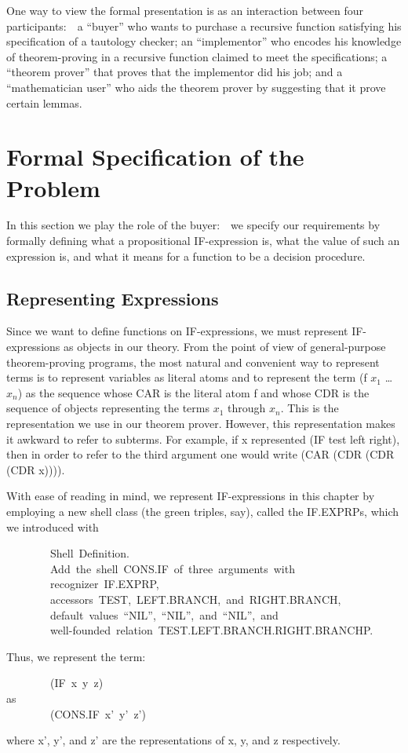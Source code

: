 \documentclass[10pt]{book}
\newenvironment{pubasis}{\begin{flushleft}}{\end{flushleft}}
\begin{document}
One way to view the formal presentation
is as an interaction between four participants:~~a ``buyer'' who
wants to purchase a recursive function satisfying his specification
of a tautology checker; an ``implementor'' who encodes his knowledge
of theorem-proving in a recursive function claimed to meet the
specifications; a ``theorem prover'' that proves that the implementor
did his job; and a ``mathematician user'' who aids the theorem prover
by suggesting that it prove certain lemmas.

\section{Formal Specification of the Problem}
In this section we play the role of the buyer:~~we specify our
requirements by formally defining what a propositional IF-expression is,
what the value of such an expression is, and what it means
for a function to be a decision procedure.
\subsection{Representing Expressions}
Since we want to define functions on IF-expressions, we
must represent IF-expressions as objects in our theory.
From the point of view of general-purpose theorem-proving programs, the most natural and convenient
way to  represent
terms is to represent variables as literal atoms and to represent
the term (f $x_{1}$ \ldots{} $x_{n}$) as the sequence whose CAR is the literal atom f and
whose CDR is the sequence of objects representing the terms $x_{1}$ through
$x_{n}$.  This is the representation we use in our theorem prover.  However,
this representation  makes it awkward to refer to subterms.
For example, if x    represented 
(IF test left right), then in order to refer to the third argument one
would write (CAR (CDR (CDR (CDR x)))).

With ease of reading in mind,
we  represent IF-expressions in this chapter by employing
a new shell class (the green triples, say), called the IF.EXPRPs,
which we introduced with
\begin{pubasis}
~~~~~~~~Shell~Definition.\\
~~~~~~~~Add~the~shell~CONS.IF~of~three~arguments~with\\
~~~~~~~~recognizer~IF.EXPRP,\\
~~~~~~~~accessors~TEST,~LEFT.BRANCH,~and~RIGHT.BRANCH,\\
~~~~~~~~default~values~``NIL'',~``NIL'',~and~``NIL'',~and\\
~~~~~~~~well-founded~relation~TEST.LEFT.BRANCH.RIGHT.BRANCHP.\\
\end{pubasis}
Thus, we  represent the term:
\begin{pubasis}
~~~~~~~~(IF~x~y~z)\\
as\\
~~~~~~~~(CONS.IF~x'~y'~z')\\
\end{pubasis}
where x', y', and z' are the representations of x, y, and z respectively.
\end{document}
